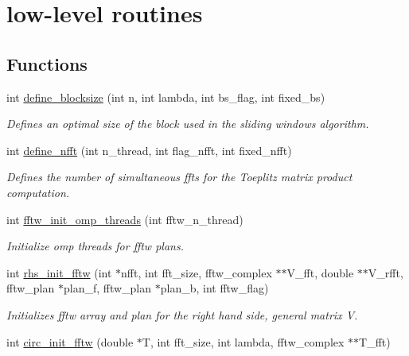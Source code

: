 \hypertarget{group__group21}{\section{low-\/level routines}
\label{group__group21}
}
\subsection*{Functions}
\begin{DoxyCompactItemize}
\item 
int \hyperlink{group__group21_ga186fc8d8825da293e94de77b77d01fba}{define\-\_\-blocksize} (int n, int lambda, int bs\-\_\-flag, int fixed\-\_\-bs)
\begin{DoxyCompactList}\small\item\em Defines an optimal size of the block used in the sliding windows algorithm. \end{DoxyCompactList}\item 
int \hyperlink{group__group21_ga4c2846ca9f67faae5746325d1ec63aac}{define\-\_\-nfft} (int n\-\_\-thread, int flag\-\_\-nfft, int fixed\-\_\-nfft)
\begin{DoxyCompactList}\small\item\em Defines the number of simultaneous ffts for the Toeplitz matrix product computation. \end{DoxyCompactList}\item 
int \hyperlink{group__group21_gae3d694bcffacaf24706f0586a223538e}{fftw\-\_\-init\-\_\-omp\-\_\-threads} (int fftw\-\_\-n\-\_\-thread)
\begin{DoxyCompactList}\small\item\em Initialize omp threads for fftw plans. \end{DoxyCompactList}\item 
int \hyperlink{group__group21_ga1a6106fbaa68aab85595935252299097}{rhs\-\_\-init\-\_\-fftw} (int $\ast$nfft, int fft\-\_\-size, fftw\-\_\-complex $\ast$$\ast$V\-\_\-fft, double $\ast$$\ast$V\-\_\-rfft, fftw\-\_\-plan $\ast$plan\-\_\-f, fftw\-\_\-plan $\ast$plan\-\_\-b, int fftw\-\_\-flag)
\begin{DoxyCompactList}\small\item\em Initializes fftw array and plan for the right hand side, general matrix V. \end{DoxyCompactList}\item 
int \hyperlink{group__group21_ga6c68921dafc6dc184d335a59df68e5f7}{circ\-\_\-init\-\_\-fftw} (double $\ast$T, int fft\-\_\-size, int lambda, fftw\-\_\-complex $\ast$$\ast$T\-\_\-fft)
$$
\end{DoxyCompactItemize}
